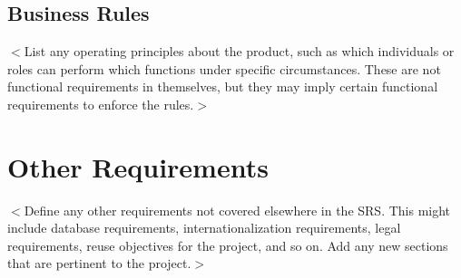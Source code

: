 \documentclass{scrreprt}
\begin{document}
\section{Business Rules}
$<$List any operating principles about the product, such as which individuals or
roles can perform which functions under specific circumstances. These are not
functional requirements in themselves, but they may imply certain functional
requirements to enforce the rules.$>$


\chapter{Other Requirements}
$<$Define any other requirements not covered elsewhere in the SRS. This might
include database requirements, internationalization requirements, legal
requirements, reuse objectives for the project, and so on. Add any new sections
that are pertinent to the project.$>$
\end{document}
